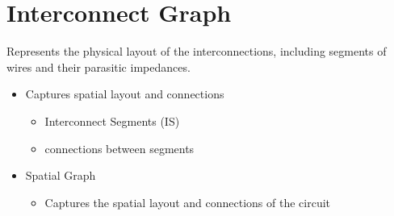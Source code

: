 \documentclass[letterpaper,10pt,english]{sphinxmanual}
\begin{document}
\section{Interconnect Graph}
\label{\detokenize{index:interconnect-graph}}
\sphinxAtStartPar
Represents the physical layout of the interconnections, including segments of wires and their parasitic impedances.
\begin{itemize}
\item {} 
\sphinxAtStartPar
Captures spatial layout and connections
\begin{itemize}
\item {} 
\sphinxAtStartPar
{} Interconnect Segments (IS)

\item {} 
\sphinxAtStartPar
{} connections between segments

\end{itemize}

\item {} 
\sphinxAtStartPar
Spatial Graph
\begin{itemize}
\item {} 
\sphinxAtStartPar
Captures the spatial layout and connections of the circuit

\end{itemize}

\end{itemize}

\end{document}
